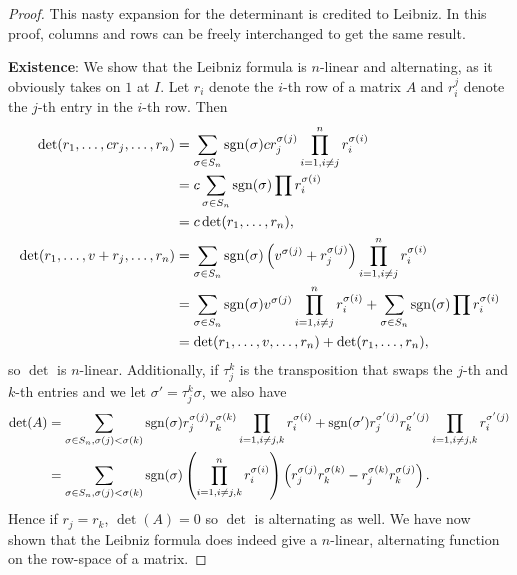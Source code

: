 \begin{proof}
This nasty expansion for the determinant is credited to Leibniz. In this
proof, columns and rows can be freely interchanged to get the same
result.

\textbf{Existence}: We show that the Leibniz formula is $n$-linear and
alternating, as it obviously takes on $1$ at $I$. Let $r_i$ denote the
$i$-th row of a matrix $A$ and $r_i^j$ denote the $j$-th entry in the
$i$-th row. Then
\[ \begin{aligned}
\det(r_1, \dots, c r_j, \dots, r_n) &= \sum_{\sigma \in S_n}
\operatorname{sgn}(\sigma) cr_j^{\sigma(j)} \prod_{i = 1, i \neq j}^n r_i^{\sigma(i)}
\\
&= c \sum_{\sigma \in S_n} \operatorname{sgn}(\sigma) \prod r_i^{\sigma(i)} \\
&= c\det(r_1, \dots, r_n), \\
\det(r_1, \dots, v + r_j, \dots, r_n) &= \sum_{\sigma \in S_n}
\operatorname{sgn}(\sigma) \left(v^{\sigma(j)} + r_j^{\sigma(j)}\right) \prod_{i = 1,
i \neq j}^n r_i^{\sigma(i)} \\
&= \sum_{\sigma \in S_n} \operatorname{sgn}(\sigma) v^{\sigma(j)} \prod_{i = 1, i \neq
j}^n r_i^{\sigma(i)} + \sum_{\sigma \in S_n} \operatorname{sgn}(\sigma) \prod
r_i^{\sigma(i)} \\
&= \det(r_1, \dots, v, \dots, r_n) + \det(r_1, \dots, r_n),
\end{aligned} \]
so $\det$ is $n$-linear. Additionally, if $\tau_j^k$ is the
transposition that swaps the $j$-th and $k$-th entries and we let
$\sigma' = \tau_j^k \sigma$, we also have
\[ \begin{aligned}
\det(A) &= \sum_{\sigma \in S_n, \sigma(j) < \sigma(k)} \operatorname{sgn}(\sigma)
r_j^{\sigma(j)} r_k^{\sigma(k)} \prod_{i = 1, i \neq j, k}
r_i^{\sigma(i)} + \operatorname{sgn}(\sigma') r_j^{\sigma'(j)} r_k^{\sigma'(j)}
\prod_{i = 1, i \neq j, k} r_i^{\sigma'(j)} \\
&= \sum_{\sigma \in S_n, \sigma(j) < \sigma(k)} \operatorname{sgn}(\sigma)
\left(\prod_{i = 1, i \neq j, k}^n r_i^{\sigma(i)}\right)
\left(r_j^{\sigma(j)} r_k^{\sigma(k)} - r_j^{\sigma(k)}
r_k^{\sigma(j)}\right).
\end{aligned} \]
Hence if $r_j = r_k$, $\det(A) = 0$ so $\det$ is alternating as well. We
have now shown that the Leibniz formula does indeed give a $n$-linear,
alternating function on the row-space of a matrix.


\end{proof}

